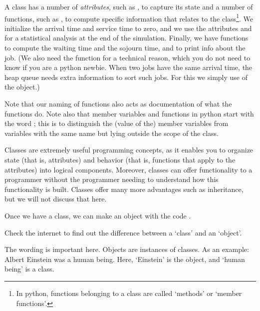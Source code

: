 A class has a number of \emph{attributes}, such as , to capture its state and a number of functions, such as , to compute specific information that relates to the class\footnote{In python, functions belonging to a class are called `methods' or `member functions'.}.
We initialize the arrival time and service time to zero, and we use the attributes  and  for a statistical analysis at the end of the simulation.
Finally, we have functions to compute the waiting time and the sojourn time, and  to print info about the job.
(We also need the function  for a technical reason, which you do not need to know if you are a python newbie.
When two jobs have the same arrival time, the heap queue needs extra information to sort such jobs.
For this we simply use  of the object.)


Note that our naming of functions also acts as documentation of what the functions do.
Note also that member variables and functions in python start with the word ; this is to distinguish the (value of the) member variables from variables with the same name but lying outside the scope of the class.

Classes are extremely useful programming concepts, as it enables you to organize state (that is, attributes) and behavior (that is, functions that apply to the attributes) into logical components.
Moreover, classes can offer functionality to a programmer without the programmer needing to understand how this functionality is built.
Classes offer many more advantages such as inheritance, but we will not discuss that here.

Once we have a class, we can make an object with the code .

\begin{exercise}
  Check the internet to find out the difference between a `class' and an `object'. 
  \begin{solution}
    The wording is important here.
    Objects are instances of classes.
    As an example: Albert Einstein was a human being.
    Here, `Einstein' is the object, and `human being' is a class.
  \end{solution}
\end{exercise}



